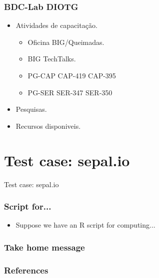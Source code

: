 \documentclass[aspectratio=169]{beamer}
\begin{document}
\begin{frame}
    \frametitle{BDC-Lab DIOTG}
    \begin{itemize}
        \item Atividades de capacitação.
            \begin{itemize}
                \item Oficina BIG/Queimadas.
                \item BIG TechTalks.
                \item PG-CAP CAP-419 CAP-395
                \item PG-SER SER-347 SER-350
            \end{itemize}
        \item Pesquisas.
        \item Recursos disponiveis.
    \end{itemize}
\end{frame}


\section{Test case: sepal.io}



\begin{frame}
    Test case: sepal.io
\end{frame}

\begin{frame}
    \frametitle{Script for...}
    \begin{itemize}
        \item Suppose we have an R script for computing...
    \end{itemize}
\end{frame}




\begin{frame}
    \frametitle{Take home message}
\end{frame}

\begin{frame}[allowframebreaks]
	\frametitle{References}
	\printbibliography
\end{frame}
\end{document}
